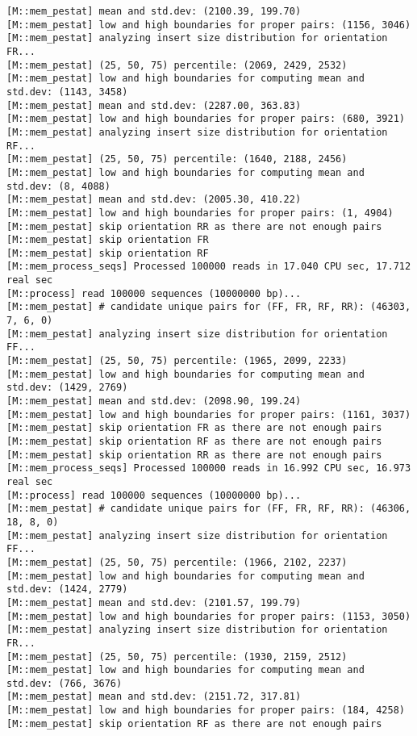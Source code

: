 \begin{lstlisting}
[M::mem_pestat] mean and std.dev: (2100.39, 199.70)
[M::mem_pestat] low and high boundaries for proper pairs: (1156, 3046)
[M::mem_pestat] analyzing insert size distribution for orientation FR...
[M::mem_pestat] (25, 50, 75) percentile: (2069, 2429, 2532)
[M::mem_pestat] low and high boundaries for computing mean and std.dev: (1143, 3458)
[M::mem_pestat] mean and std.dev: (2287.00, 363.83)
[M::mem_pestat] low and high boundaries for proper pairs: (680, 3921)
[M::mem_pestat] analyzing insert size distribution for orientation RF...
[M::mem_pestat] (25, 50, 75) percentile: (1640, 2188, 2456)
[M::mem_pestat] low and high boundaries for computing mean and std.dev: (8, 4088)
[M::mem_pestat] mean and std.dev: (2005.30, 410.22)
[M::mem_pestat] low and high boundaries for proper pairs: (1, 4904)
[M::mem_pestat] skip orientation RR as there are not enough pairs
[M::mem_pestat] skip orientation FR
[M::mem_pestat] skip orientation RF
[M::mem_process_seqs] Processed 100000 reads in 17.040 CPU sec, 17.712 real sec
[M::process] read 100000 sequences (10000000 bp)...
[M::mem_pestat] # candidate unique pairs for (FF, FR, RF, RR): (46303, 7, 6, 0)
[M::mem_pestat] analyzing insert size distribution for orientation FF...
[M::mem_pestat] (25, 50, 75) percentile: (1965, 2099, 2233)
[M::mem_pestat] low and high boundaries for computing mean and std.dev: (1429, 2769)
[M::mem_pestat] mean and std.dev: (2098.90, 199.24)
[M::mem_pestat] low and high boundaries for proper pairs: (1161, 3037)
[M::mem_pestat] skip orientation FR as there are not enough pairs
[M::mem_pestat] skip orientation RF as there are not enough pairs
[M::mem_pestat] skip orientation RR as there are not enough pairs
[M::mem_process_seqs] Processed 100000 reads in 16.992 CPU sec, 16.973 real sec
[M::process] read 100000 sequences (10000000 bp)...
[M::mem_pestat] # candidate unique pairs for (FF, FR, RF, RR): (46306, 18, 8, 0)
[M::mem_pestat] analyzing insert size distribution for orientation FF...
[M::mem_pestat] (25, 50, 75) percentile: (1966, 2102, 2237)
[M::mem_pestat] low and high boundaries for computing mean and std.dev: (1424, 2779)
[M::mem_pestat] mean and std.dev: (2101.57, 199.79)
[M::mem_pestat] low and high boundaries for proper pairs: (1153, 3050)
[M::mem_pestat] analyzing insert size distribution for orientation FR...
[M::mem_pestat] (25, 50, 75) percentile: (1930, 2159, 2512)
[M::mem_pestat] low and high boundaries for computing mean and std.dev: (766, 3676)
[M::mem_pestat] mean and std.dev: (2151.72, 317.81)
[M::mem_pestat] low and high boundaries for proper pairs: (184, 4258)
[M::mem_pestat] skip orientation RF as there are not enough pairs

\end{lstlisting}
